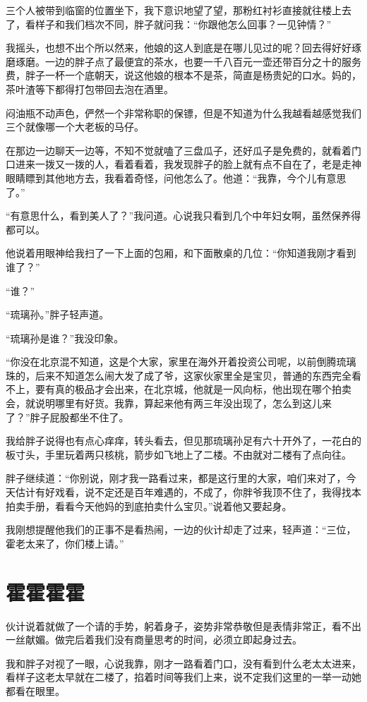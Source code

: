 三个人被带到临窗的位置坐下，我下意识地望了望，那粉红衬衫直接就往楼上去了，看样子和我们档次不同，胖子就问我：“你跟他怎么回事？一见钟情？”

我摇头，也想不出个所以然来，他娘的这人到底是在哪儿见过的呢？回去得好好琢磨琢磨。一边的胖子点了最便宜的茶水，也要一千八百元一壶还带百分之十的服务费，胖子一杯一个底朝天，说这他娘的根本不是茶，简直是杨贵妃的口水。妈的，茶叶渣等下都得打包带回去泡在酒里。

闷油瓶不动声色，俨然一个非常称职的保镖，但是不知道为什么我越看越感觉我们三个就像哪一个大老板的马仔。

在那边一边聊天一边等，不知不觉就嗑了三盘瓜子，还好瓜子是免费的，就看着门口进来一拨又一拨的人，看着看着，我发现胖子的脸上就有点不自在了，老是走神眼睛瞟到其他地方去，我看着奇怪，问他怎么了。他道：“我靠，今个儿有意思了。”

“有意思什么，看到美人了？”我问道。心说我只看到几个中年妇女啊，虽然保养得都可以。

他说着用眼神给我扫了一下上面的包厢，和下面散桌的几位：“你知道我刚才看到谁了？”

“谁？”

“琉璃孙。”胖子轻声道。

“琉璃孙是谁？”我没印象。

“你没在北京混不知道，这是个大家，家里在海外开着投资公司呢，以前倒腾琉璃珠的，后来不知道怎么闹大发了成了爷，这家伙家里全是宝贝，普通的东西完全看不上，要有真的极品才会出来，在北京城，他就是一风向标，他出现在哪个拍卖会，就说明哪里有好货。我靠，算起来他有两三年没出现了，怎么到这儿来了？”胖子屁股都坐不住了。

我给胖子说得也有点心痒痒，转头看去，但见那琉璃孙足有六十开外了，一花白的板寸头，手里玩着两只核桃，箭步如飞地上了二楼。不由就对二楼有了点向往。

胖子继续道：“你别说，刚才我一路看过来，都是这行里的大家，咱们来对了，今天估计有好戏看，说不定还是百年难遇的，不成了，你胖爷我顶不住了，我得找本拍卖手册，看看今天他妈的到底拍卖什么宝贝。”说着他又要起身。

我刚想提醒他我们的正事不是看热闹，一边的伙计却走了过来，轻声道：“三位，霍老太来了，你们楼上请。”

\chapter{霍霍霍霍}

伙计说着就做了一个请的手势，躬着身子，姿势非常恭敬但是表情非常正，看不出一丝献媚。做完后着我们没有商量思考的时间，必须立即起身过去。

我和胖子对视了一眼，心说我靠，刚才一路看着门口，没有看到什么老太太进来，看样子这老太早就在二楼了，掐着时间等我们上来，说不定我们这里的一举一动她都看在眼里。

